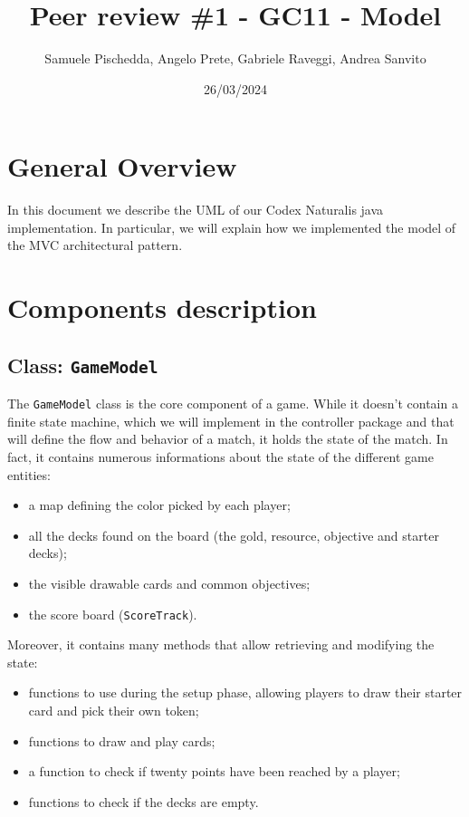 \documentclass{article}
\title{Peer review \#1 - GC11 - Model}
\author{Samuele Pischedda, Angelo Prete, Gabriele Raveggi, Andrea Sanvito }
\date{26/03/2024}
\begin{document}
\begin{titlepage}
\maketitle
\end{titlepage}

\section*{General Overview}
In this document we describe the UML of our Codex Naturalis java implementation. \newline
In particular, we will explain how we implemented the model of the MVC architectural pattern.

\newpage
\section*{Components description}
\setcounter{section}{1}
\subsection[1]{Class: \texttt{GameModel}}
The \texttt{GameModel} class is the core component of a game.
While it doesn't contain a finite state machine, which we will implement in the controller package and that will define the flow and behavior of a match, it holds the state of the match.
In fact, it contains numerous informations about the state of the different game entities:
\begin{itemize}
    \item a map defining the color picked by each player;
    \item all the decks found on the board (the gold, resource, objective and starter decks);
    \item the visible drawable cards and common objectives;
    \item the score board (\texttt{ScoreTrack}).
\end{itemize}
Moreover, it contains many methods that allow retrieving and modifying the state:
\begin{itemize}
    \item functions to use during the setup phase, allowing players to draw their starter card and pick their own token;
    \item functions to draw and play cards;
    \item a function to check if twenty points have been reached by a player;
    \item functions to check if the decks are empty.
\end{itemize}
\end{document}
